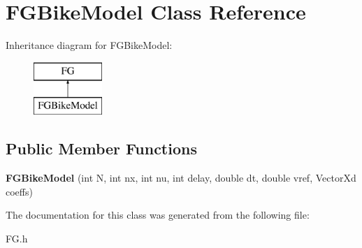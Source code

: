 \hypertarget{classFGBikeModel}{}\section{F\+G\+Bike\+Model Class Reference}
\label{classFGBikeModel}
Inheritance diagram for F\+G\+Bike\+Model\+:\begin{figure}[H]
\begin{center}
\leavevmode
\includegraphics[height=2.000000cm]{classFGBikeModel}
\end{center}
\end{figure}
\subsection*{Public Member Functions}
\begin{DoxyCompactItemize}
\item 
\mbox{\label{classFGBikeModel_a95c35883d5a9b3eac17dc9ea536054b3}} 
{\bfseries F\+G\+Bike\+Model} (int N, int nx, int nu, int delay, double dt, double vref, Vector\+Xd coeffs)
\end{DoxyCompactItemize}


The documentation for this class was generated from the following file\+:\begin{DoxyCompactItemize}
\item 
F\+G.\+h\end{DoxyCompactItemize}
